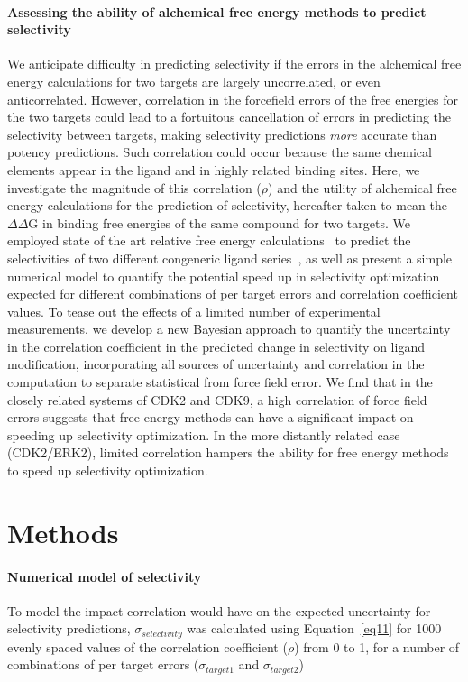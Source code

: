 \documentclass[9pt,lineno]{elife-modified} %
\begin{document}
\paragraph{Assessing the ability of alchemical free energy methods to predict selectivity}
We anticipate difficulty in predicting selectivity if the errors in the alchemical free energy calculations for two targets are largely uncorrelated, or even anticorrelated. However, correlation in the forcefield errors of the free energies for the two targets could lead to a fortuitous cancellation of errors in predicting the selectivity between targets, making selectivity predictions \emph{more} accurate than potency predictions. Such correlation could occur because the same chemical elements appear in the ligand and in highly related binding sites. 
Here, we investigate the magnitude of this correlation ($\rho$) and the utility of alchemical free energy calculations for the prediction of selectivity, hereafter taken to mean the $\Delta \Delta$G in binding free energies of the same compound for two targets. We employed state of the art relative free energy calculations~\citep{Wang:J.Am.Chem.Soc.:2015,Abel:2017jt} to predict the selectivities of two different congeneric ligand series~\citep{Shao2013-oe, Blake2016-su}, as well as present a simple numerical model to quantify the potential speed up in selectivity optimization expected for different combinations of per target errors and correlation coefficient values. To tease out the effects of a limited number of experimental measurements, we develop a new Bayesian approach to quantify the uncertainty in the correlation coefficient in the predicted change in selectivity on ligand modification, incorporating all sources of uncertainty and correlation in the computation to separate statistical from force field error. We find that in the closely related systems of CDK2 and CDK9, a high correlation of force field errors suggests that free energy methods can have a significant impact on speeding up selectivity optimization. In the more distantly related case (CDK2/ERK2), limited correlation hampers the ability for free energy methods to speed up selectivity optimization. 

   
%
%
%
%
\section{Methods}

\paragraph{Numerical model of selectivity}
To model the impact correlation would have on the expected uncertainty for selectivity predictions, $\sigma_{selectivity}$ was calculated using Equation~\ref{eq11} for 1000 evenly spaced values of the correlation coefficient ($\rho$) from 0 to 1, for a number of combinations of per target errors ($\sigma_{target1}$ and $\sigma_{target2}$) 
\end{document}
